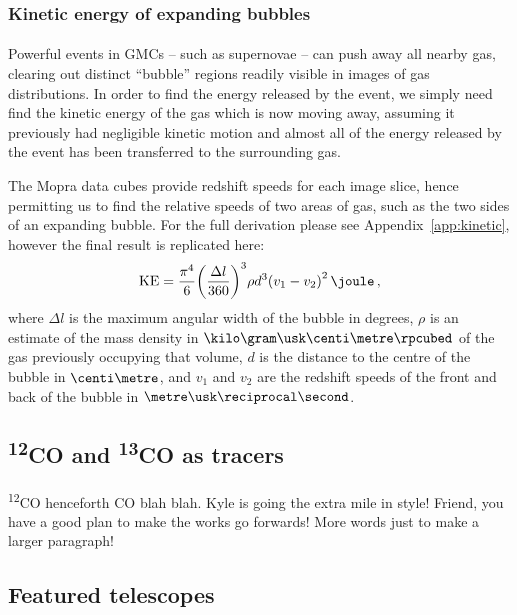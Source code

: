 \documentclass[a4paper, titlepage, oneside]{article}
\newcommand{\elem}[2]{\textsuperscript{#1}{#2}}
\begin{document}
\begin{multicols}{2}
\subsubsection{Kinetic energy of expanding bubbles}
\label{sec:kinetic}
\paragraph{}
Powerful events in GMCs -- such as supernovae -- can push away all nearby gas, clearing out distinct ``bubble'' regions readily visible in images of gas distributions. In order to find the energy released by the event, we simply need find the kinetic energy of the gas which is now moving away, assuming it previously had negligible kinetic motion and almost all of the energy released by the event has been transferred to the surrounding gas.

The Mopra data cubes provide redshift speeds for each image slice, hence permitting us to find the relative speeds of two areas of gas, such as the two sides of an expanding bubble. For the full derivation please see Appendix~\ref{app:kinetic}, however the final result is replicated here:
\begin{equation}
  \mathrm{KE} = \frac{\pi ^ 4}{6} {\left( \frac{\Delta l}{360} \right)}^3 \rho d^3 {(v_1 - v_2)}^2 \, \joule \, ,
\end{equation}
where \(\Delta l\) is the maximum angular width of the bubble in degrees, \(\rho\) is an estimate of the mass density in \(\kilo\gram\usk\centi\metre\rpcubed\) of the gas previously occupying that volume, \(d\) is the distance to the centre of the bubble in \(\centi\metre\), and \(v_1\) and \(v_2\) are the redshift speeds of the front and back of the bubble in \(\metre\usk\reciprocal\second\).

\subsection{\elem{12}{CO} and \elem{13}{CO} as tracers}
\paragraph{}
\elem{12}{CO} henceforth CO blah blah. Kyle is going the extra mile in style! Friend, you have a good plan to make the works go forwards! More words just to make a larger paragraph!

\subsection{Featured telescopes}

\end{multicols}
\end{document}
